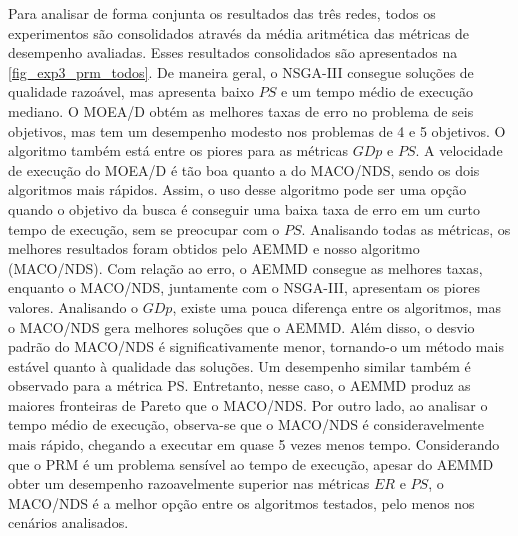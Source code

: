 Para analisar de forma conjunta os resultados das três redes, todos os experimentos são consolidados através da média aritmética das métricas de desempenho avaliadas. Esses resultados consolidados são apresentados na \autoref{fig_exp3_prm_todos}. De maneira geral, o NSGA-III consegue soluções de qualidade razoável, mas apresenta baixo $PS$ e um tempo médio de execução mediano. O MOEA/D obtém as melhores taxas de erro no problema de seis objetivos, mas tem um desempenho modesto nos problemas de 4 e 5 objetivos. O algoritmo também está entre os piores para as métricas $GDp$ e $PS$. A velocidade de execução do MOEA/D é tão boa quanto a do MACO/NDS, sendo os dois algoritmos mais rápidos. Assim, o uso desse algoritmo pode ser uma opção quando o objetivo da busca é conseguir uma baixa taxa de erro em um curto tempo de execução, sem se preocupar com o $PS$. Analisando todas as métricas, os melhores resultados foram obtidos pelo AEMMD e nosso algoritmo (MACO/NDS). Com relação ao erro, o AEMMD consegue as melhores taxas, enquanto o MACO/NDS, juntamente com o NSGA-III, apresentam os piores valores. Analisando o $GDp$, existe uma pouca diferença entre os algoritmos, mas o MACO/NDS gera melhores soluções que o AEMMD. Além disso, o desvio padrão do MACO/NDS é significativamente menor, tornando-o um método mais estável quanto à qualidade das soluções. Um desempenho similar também é observado para a métrica PS. Entretanto, nesse caso, o AEMMD produz as maiores fronteiras de Pareto que o MACO/NDS. Por outro lado, ao analisar o tempo médio de execução, observa-se que o MACO/NDS é consideravelmente mais rápido, chegando a executar em quase 5 vezes menos tempo. Considerando que o PRM é um problema sensível ao tempo de execução, apesar do AEMMD obter um desempenho razoavelmente superior nas métricas $ER$ e $PS$, o MACO/NDS é a melhor opção entre os algoritmos testados, pelo menos nos cenários analisados.

